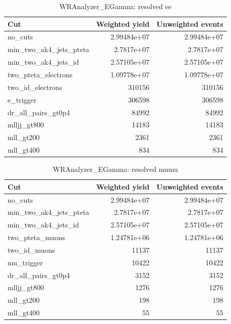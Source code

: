 \documentclass{article}
\begin{document}
\begin{table}[htbp]
\centering
\caption{WRAnalyzer\_EGamma: resolved ee}
\begin{tabular}{lrr}
\hline
Cut & Weighted yield & Unweighted events \\
\hline
no\_cuts & 2.99484e+07 & 2.99484e+07 \\
min\_two\_ak4\_jets\_pteta & 2.7817e+07 & 2.7817e+07 \\
min\_two\_ak4\_jets\_id & 2.57105e+07 & 2.57105e+07 \\
two\_pteta\_electrons & 1.09778e+07 & 1.09778e+07 \\
two\_id\_electrons & 310156 & 310156 \\
e\_trigger & 306598 & 306598 \\
dr\_all\_pairs\_gt0p4 & 84992 & 84992 \\
mlljj\_gt800 & 14183 & 14183 \\
mll\_gt200 & 2361 & 2361 \\
mll\_gt400 & 834 & 834 \\
\hline
\end{tabular}
\end{table}

\begin{table}[htbp]
\centering
\caption{WRAnalyzer\_EGamma: resolved mumu}
\begin{tabular}{lrr}
\hline
Cut & Weighted yield & Unweighted events \\
\hline
no\_cuts & 2.99484e+07 & 2.99484e+07 \\
min\_two\_ak4\_jets\_pteta & 2.7817e+07 & 2.7817e+07 \\
min\_two\_ak4\_jets\_id & 2.57105e+07 & 2.57105e+07 \\
two\_pteta\_muons & 1.24781e+06 & 1.24781e+06 \\
two\_id\_muons & 11137 & 11137 \\
mu\_trigger & 10422 & 10422 \\
dr\_all\_pairs\_gt0p4 & 3152 & 3152 \\
mlljj\_gt800 & 1276 & 1276 \\
mll\_gt200 & 198 & 198 \\
mll\_gt400 & 55 & 55 \\
\hline
\end{tabular}
\end{table}
\end{document}
